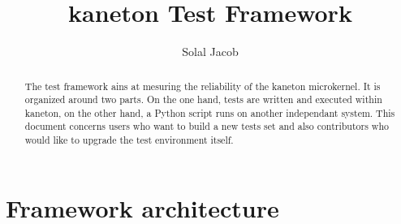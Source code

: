 
%
%



%
%


%
%

\title{kaneton Test Framework}

%
%

\author{\small{Solal Jacob}}

%
%



%
%

\maketitle

%
%

\begin{abstract}

\indent The test framework ains at mesuring the reliability of the kaneton
microkernel. It is organized around two parts. On the one hand, tests are
written and executed within kaneton, on the other hand, a Python script runs on
another independant system. This document concerns users who want to build a
new tests set and also contributors who would like to upgrade the test
environment itself.

\end{abstract}

%
%

\section{Framework architecture}

